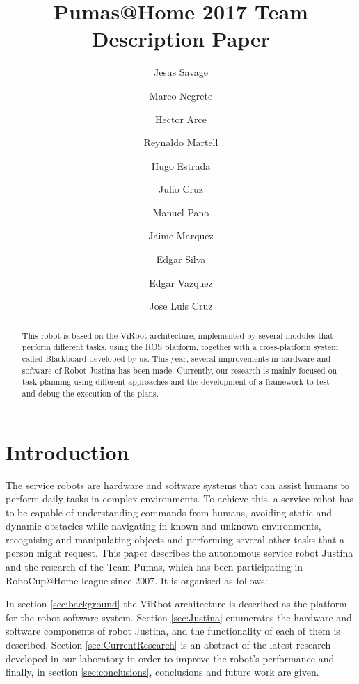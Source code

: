 \documentclass{llncs}
\begin{document}
\title{Pumas@Home 2017 Team Description Paper}
\author{
	Jesus Savage 
	\and Marco Negrete 
	\and Hector Arce 
	\and Reynaldo Martell 
	\and Hugo Estrada 
	\and Julio Cruz 
	\and Manuel Pano 
	\and Jaime Marquez 
	\and Edgar Silva
	\and Edgar Vazquez
	\and Jose Luis Cruz
}
\maketitle


\begin{abstract}
This robot is based on the ViRbot architecture, implemented by several modules that perform different tasks, using the ROS platform, together with a cross-platform system called Blackboard developed by us. This year, several improvements in hardware and software of Robot Justina has been made. Currently, our research is mainly focused on task planning using different approaches and the development of a framework to test and debug the execution of the plans.
\end{abstract}


\section{Introduction}

The service robots are hardware and software systems that can assist humans to perform daily tasks in complex environments. To achieve this, a service robot has to be capable of understanding commands from humans, avoiding static and dynamic obstacles while navigating in known and unknown environments, recognising and manipulating objects and performing several other tasks that a person might request. This paper describes the autonomous service robot Justina and the research of the Team Pumas, which has been participating in RoboCup@Home league since 2007. It is organised as follows:

In section \ref{sec:background} the ViRbot architecture is described as the platform for the robot software system. Section \ref{sec:Justina} enumerates the hardware and software components of robot Justina, and the functionality of each of them is described. Section \ref{sec:CurrentResearch} is an abstract of the latest research developed in our laboratory in order to improve the robot's performance and finally, in section \ref{sec:conclusions}, conclusions and future work are given.
\end{document}
